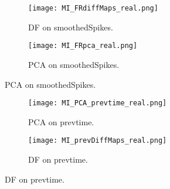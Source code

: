 \vspace{2in}
\begin{frame}[allowframebreaks]
\begin{figure}
\centering
\begin{subfigure}{.5\textwidth}
\texttt{[image: MI\_FRdiffMaps\_real.png]}
\caption{DF on smoothedSpikes.}
\end{subfigure}%
\begin{subfigure}{0.5\textwidth}
\texttt{[image: MI\_FRpca\_real.png]}
\caption{PCA on smoothedSpikes.}
\end{subfigure}
\end{figure}
\end{frame}


\vspace{1in}
\begin{frame}[allowframebreaks]
\begin{figure}
\centering
\begin{subfigure}{.5\textwidth}
\texttt{[image: MI\_PCA\_prevtime\_real.png]}
\caption{PCA on prevtime.}
\end{subfigure}%
\begin{subfigure}{0.5\textwidth}
\texttt{[image: MI\_prevDiffMaps\_real.png]}
\caption{DF on prevtime.}
\end{subfigure}
\end{figure}
\end{frame}










































